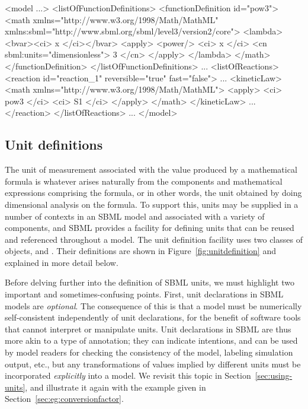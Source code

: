 \begin{example}
<model ...>
   <listOfFunctionDefinitions>
       <functionDefinition id="pow3">
           <math xmlns="http://www.w3.org/1998/Math/MathML"
                 xmlns:sbml="http://www.sbml.org/sbml/level3/version2/core">
               <lambda>
                   <bvar><ci> x </ci></bvar>
                   <apply> <power/> <ci> x </ci> <cn sbml:units="dimensionless"> 3 </cn> </apply>
               </lambda>
           </math>
       </functionDefinition>
   </listOfFunctionDefinitions>
   ...
   <listOfReactions>
       <reaction id="reaction_1" reversible="true" fast="false">
           ...
           <kineticLaw>
               <math xmlns="http://www.w3.org/1998/Math/MathML">
                   <apply> <ci> pow3 </ci> <ci> S1 </ci> </apply>
               </math>
           </kineticLaw>
           ...
       </reaction>
   </listOfReactions>
   ...
</model>\end{example}


\subsection{Unit definitions}
\label{sec:unitdefinitions}

The unit of measurement associated with the value produced by a
mathematical formula is whatever arises naturally from the
components and mathematical expressions comprising the formula, or
in other words, the unit obtained by doing dimensional analysis on
the formula.  To support this, units may be supplied in a number
of contexts in an SBML model and associated with a variety of
components, and SBML provides a facility for defining units that
can be reused and referenced throughout a model.  The unit
definition facility uses two classes of objects, \UnitDefinition
and \Unit.  Their definitions are shown in
Figure~\vref{fig:unitdefinition} and explained in more detail
below.

Before delving further into the definition of SBML units, we must
highlight two important and sometimes-confusing points.  First,
unit declarations in SBML models are \emph{optional}.  The
consequence of this is that a model must be numerically
self-consistent independently of unit declarations, for the
benefit of software tools that cannot interpret or manipulate
units.  Unit declarations in SBML are thus more akin to a type of
annotation; they can indicate intentions, and can be used by model
readers for checking the consistency of the model, labeling
simulation output, etc., but any transformations of values implied
by different units must be incorporated \emph{explicitly} into a
model.  We revisit this topic in Section~\ref{sec:using-units},
and illustrate it again with the example given in
Section~\ref{sec:eg:conversionfactor}.

